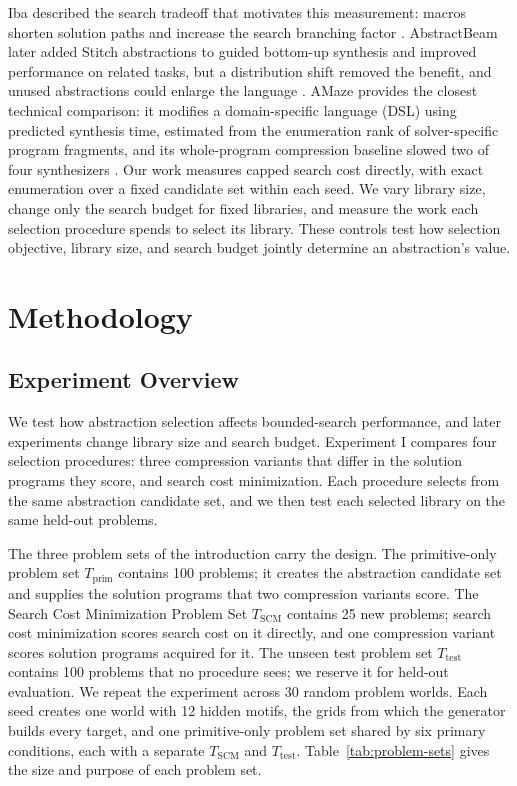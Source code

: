 \documentclass[10pt]{article}
\begin{document}
Iba described the search tradeoff that motivates this measurement: macros
shorten solution paths and increase the search branching factor
\citep{iba1989macro}. AbstractBeam later added Stitch abstractions to guided
bottom-up synthesis and improved performance on related tasks, but a
distribution shift removed the benefit, and unused abstractions could enlarge
the language \citep{zenkner2024abstractbeam}. AMaze provides the closest
technical comparison: it modifies a domain-specific language (DSL) using
predicted synthesis time,
estimated from the enumeration rank of solver-specific program fragments, and
its whole-program compression baseline slowed two of four synthesizers
\citep{ye2026amaze}. Our work measures capped search cost directly, with exact
enumeration over a fixed candidate set within each seed. We vary library
size, change only the search budget for fixed libraries, and measure the work
each selection procedure spends to select its library. These controls test
how selection objective, library size, and search budget jointly determine an
abstraction's value.
\section{Methodology}

\subsection{Experiment Overview}

We test how abstraction selection affects bounded-search performance, and
later experiments change library size and search budget. Experiment I
compares four selection procedures: three compression variants that differ in
the solution programs they score, and search cost minimization. Each
procedure selects from the same abstraction candidate set, and we then test
each selected library on the same held-out problems.

The three problem sets of the introduction carry the design. The
primitive-only problem set $T_{\mathrm{prim}}$ contains 100
problems; it creates the abstraction candidate set and supplies the solution
programs that two compression variants score. The Search Cost Minimization
Problem Set $T_{\mathrm{SCM}}$ contains 25 new problems; search
cost minimization scores search cost on it directly, and one compression
variant scores solution programs acquired for it. The unseen test problem set
$T_{\mathrm{test}}$ contains 100 problems that no procedure sees;
we reserve it for held-out evaluation.
We repeat the experiment across 30 random problem worlds. Each seed creates
one world with 12 hidden motifs, the grids from which the generator builds
every target, and one primitive-only problem set shared by
six primary conditions, each with a separate $T_{\mathrm{SCM}}$ and
$T_{\mathrm{test}}$.
Table~\ref{tab:problem-sets} gives the size and purpose of each problem set.
\end{document}
